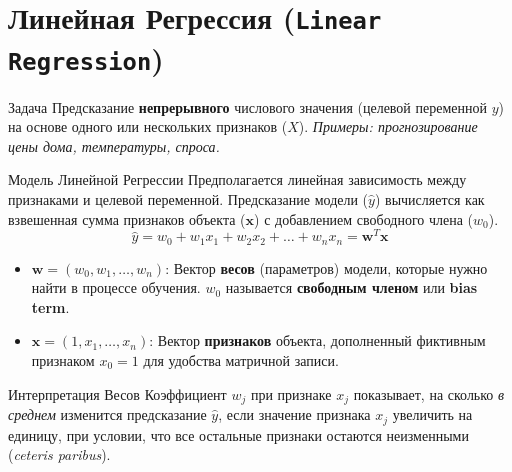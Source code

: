 
\section{Линейная Регрессия (\texttt{Linear Regression})}

\begin{textbox}{Задача}
    Предсказание \textbf{непрерывного} числового значения (целевой переменной $y$) на основе одного или нескольких признаков ($X$).
    \textit{Примеры: прогнозирование цены дома, температуры, спроса.}
\end{textbox}

\begin{myblock}{Модель Линейной Регрессии}
    Предполагается линейная зависимость между признаками и целевой переменной. Предсказание модели ($\hat{y}$) вычисляется как взвешенная сумма признаков объекта ($\mathbf{x}$) с добавлением свободного члена ($w_0$).
    \[ \hat{y} = w_0 + w_1 x_1 + w_2 x_2 + \dots + w_n x_n = \mathbf{w}^T \mathbf{x} \]
    \begin{itemize}[nosep, leftmargin=*]
        \item $\mathbf{w} = (w_0, w_1, \dots, w_n)$: Вектор \textbf{весов} (параметров) модели, которые нужно найти в процессе обучения. $w_0$ называется \textbf{свободным членом} или \textbf{bias term}.
        \item $\mathbf{x} = (1, x_1, \dots, x_n)$: Вектор \textbf{признаков} объекта, дополненный фиктивным признаком $x_0 = 1$ для удобства матричной записи.
    \end{itemize}
\end{myblock}

\begin{myblock}{Интерпретация Весов}
    Коэффициент $w_j$ при признаке $x_j$ показывает, на сколько \textit{в среднем} изменится предсказание $\hat{y}$, если значение признака $x_j$ увеличить на единицу, при условии, что все остальные признаки остаются неизменными (\textit{ceteris paribus}).
\end{myblock}

